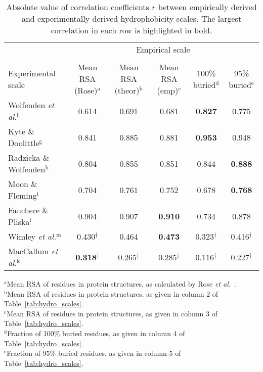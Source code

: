 \documentclass[11pt]{article}
\begin{document}
\begin{table}[H]
\caption{\label{tab:Corr}Absolute value of correlation coefficients $r$ between empirically derived and experimentally derived hydrophobicity scales. The largest correlation in each row is highlighted in bold.}
\begin{center}
\footnotesize
\begin{tabular}{lccccc}
 & \multicolumn{5}{c}{Empirical scale} \\ \cline{2-6}\\[-2ex]
Experimental scale & Mean RSA (Rose)$^\text{a}$ & Mean RSA (theor)$^\text{b}$ & Mean RSA (emp)$^\text{c}$ & 100\% buried$^\text{d}$ & 95\% buried$^\text{e}$\\
\hline
Wolfenden \emph{et al.}$^\text{f}$ & 0.614 & 0.691 & 0.681 & \textbf{0.827} & 0.775 \\
Kyte \& Doolittle$^\text{g}$ & 0.841 & 0.885 & 0.881 & \textbf{0.953} & 0.948 \\
Radzicka \& Wolfenden$^\text{h}$ & 0.804 & 0.855 & 0.851 & 0.844 & \textbf{0.888} \\
Moon \& Fleming$^\text{i}$ & 0.704 & 0.761 & 0.752 & 0.678 & \bf{0.768} \\
Fauchere \& Pliska$^\text{l}$ & 0.904 & 0.907 & \textbf{0.910} & 0.734 & 0.878 \\
Wimley \emph{et al.}$^\text{m}$ & 0.430$^\dagger$ & 0.464 & \textbf{0.473} & 0.323$^\dagger$ & 0.416$^\dagger$ \\
MacCallum \emph{et al.}$^\text{k}$ & \textbf{0.318}$^\dagger$ & 0.265$^\dagger$ & 0.285$^\dagger$ & 0.116$^\dagger$ & 0.227$^\dagger$ \\
\hline
\end{tabular}
\end{center}
{\footnotesize
\begin{raggedright}
$^\text{a}$Mean RSA of residues in protein structures, as calculated by Rose \emph{et al.}~\cite{Rose1985}.\\
$^\text{b}$Mean RSA of residues in protein structures, as given in column 2 of Table~\ref{tab:hydro_scales}.\\ 
$^\text{c}$Mean RSA of residues in protein structures, as given in column 3 of Table~\ref{tab:hydro_scales}.\\
$^\text{d}$Fraction of 100\% buried residues, as given in column 4 of Table~\ref{tab:hydro_scales}.\\
$^\text{e}$Fraction of 95\% buried residues, as given in column 5 of Table~\ref{tab:hydro_scales}.\\

\end{raggedright}}
\end{table}
\end{document}
